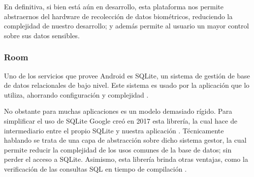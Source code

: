             En definitiva, si bien está aún en desarrollo, esta plataforma nos permite abstraernos del hardware de
            recolección de datos biométricos, reduciendo la complejidad de nuestro desarrollo; y además permite al 
            usuario un mayor control sobre sus datos sensibles.
            
        \subsubsection{Room}
            Uno de los servicios que provee Android es SQLite, un sistema de gestión de base de datos relacionales de 
            bajo nivel. Este sistema es usado por la aplicación que lo utiliza, ahorrando configuración y complejidad
            \cite{recio_persistencia_2019}. 
            
            No obstante para muchas aplicaciones es un modelo demasiado rígido. Para simplificar el uso de SQLite
            Google creó en 2017 esta librería, la cual hace de intermediario entre el propio SQLite y nuestra 
            aplicación \cite{leiva_room_2020}. Técnicamente hablando se trata de una capa de abstracción sobre dicho
            sistema gestor, la cual permite reducir la complejidad de los usos comunes de la base de datos; sin perder
            el acceso a SQLite. Asimismo, esta librería brinda otras ventajas, como la verificación de las consultas
            SQL en tiempo de compilación \cite{noauthor_como_nodate}.

